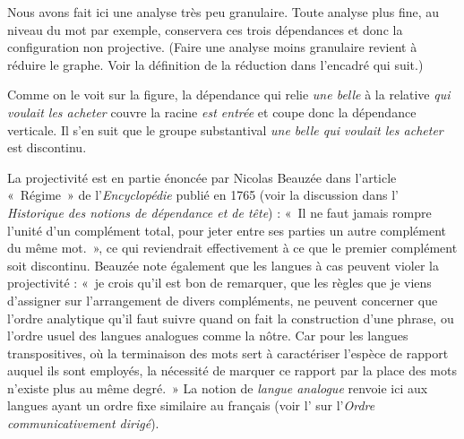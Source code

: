 Nous avons fait ici une analyse très peu granulaire. Toute analyse plus fine, au niveau du mot par exemple, conservera ces trois dépendances et donc la configuration non projective. (Faire une analyse moins granulaire revient à réduire le graphe. Voir la définition de la réduction dans l’encadré qui suit.)

Comme on le voit sur la figure, la dépendance qui relie \textit{une belle} à la relative \textit{qui voulait les acheter} couvre la racine \textit{est entrée} et coupe donc la dépendance verticale. Il s’en suit que le groupe substantival \textit{une belle qui voulait les acheter} est discontinu.

La projectivité est en partie énoncée par Nicolas Beauzée dans l’article «~Régime~» de l’\textit{Encyclopédie} publié en 1765 (voir la discussion dans l’ \textit{Historique des notions de dépendance et de tête}) : «~Il ne faut jamais rompre l’unité d’un complément total, pour jeter entre ses parties un autre complément du même mot.~», ce qui reviendrait effectivement à ce que le premier complément soit discontinu. Beauzée note également que les langues à cas peuvent violer la projectivité : «~je crois qu’il est bon de remarquer, que les règles que je viens d’assigner sur l’arrangement de divers compléments, ne peuvent concerner que l’ordre analytique qu’il faut suivre quand on fait la construction d’une phrase, ou l’ordre usuel des langues analogues comme la nôtre. Car pour les langues transpositives, où la terminaison des mots sert à caractériser l’espèce de rapport auquel ils sont employés, la nécessité de marquer ce rapport par la place des mots n’existe plus au même degré.~» La notion de \textit{langue analogue} renvoie ici aux langues ayant un ordre fixe similaire au français (voir l’ sur l’\textit{Ordre communicativement dirigé}).

